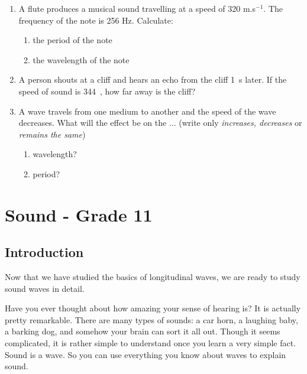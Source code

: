 \begin{enumerate}
\item A flute produces a musical sound travelling at a speed of 320 m.s$^{-1}$. The frequency of the note is 256 Hz. Calculate:
\begin{enumerate}
\item the period of the note
\item the wavelength of the note
\end{enumerate}

\item{A person shouts at a cliff and hears an echo from the cliff 1~s later. If the speed of sound is 344~\ms, how far away is the cliff?}

\item A wave travels from one medium to another and the speed of the wave decreases. What will the effect be on the ... (write only \emph{increases, decreases} or \emph{remains the same})
\begin{enumerate}
\item wavelength?
\item period?
\end{enumerate}
\end{enumerate}







\chapter{Sound - Grade 11}
\label{p:wsl:s11}


\section{Introduction}
Now that we have studied the basics of longitudinal waves, we are ready to study sound waves in detail.

Have you ever thought about how amazing your sense of hearing is? It is actually pretty remarkable. There are many types of sounds: a car horn, a laughing baby, a barking dog, and somehow your brain can sort it all out. Though it seems complicated, it is rather simple to understand once you learn a very simple fact. Sound is a wave. So you can use everything you know about waves to explain sound.

